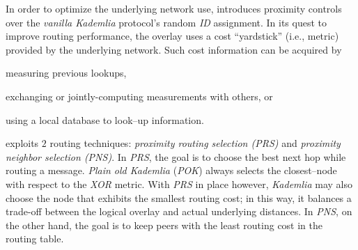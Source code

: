 
In order to optimize the underlying network use,
\cite{KLKP2008} introduces proximity
controls over the \emph{vanilla Kademlia} 
protocol's random \emph{ID} assignment.
In its quest to improve routing performance, the overlay uses 
a cost ``yardstick'' (i.e., metric) provided by the underlying network.
Such cost information can be acquired by
\begin{inparaenum}
  \item measuring previous lookups,
  \item exchanging or jointly-computing measurements with 
	others, or 
  \item using a local database to look--up information.
\end{inparaenum}

\cite{KLKP2008} exploits $2$ routing techniques: 
\emph{proximity routing selection (PRS)} and 
\emph{proximity neighbor selection (PNS)}.
In \emph{PRS}, the goal is to choose the best next hop while routing a message.
\emph{Plain old Kademlia} (\emph{POK}) always selects the closest--node 
with respect to the \emph{XOR} metric.
With \emph{PRS} in place however, \emph{Kademlia} may also choose 
the node that exhibits the smallest routing cost; in this way, 
it balances a trade-off between the logical overlay and 
actual underlying distances.
In \emph{PNS}, on the other hand, the goal is to keep peers 
with the least routing cost in the routing table. 

